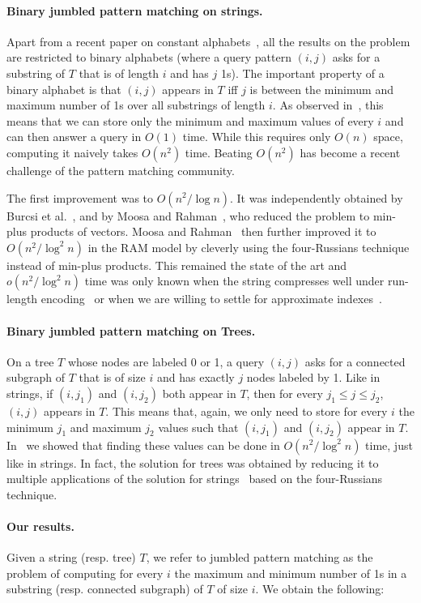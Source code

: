 \documentclass[11pt]{llncs}
\begin{document}
\paragraph{\bf Binary jumbled pattern matching on strings.}
Apart from a recent paper on constant alphabets~\cite{ESA13}, all the
 results on the problem are restricted to binary alphabets (where a query pattern $(i,j)$ asks for a substring of $T$ that is of length $i$ and has $j$ 1s). The important property of a binary alphabet is that $(i,j)$ appears in $T$ iff $j$ is between the minimum and maximum number of 1s over all substrings of length $i$.
As observed in~\cite{CFL09}, this means that we can store only the  minimum and maximum values of every $i$ and can then answer a query in $O(1)$ time. While this requires only $O(n)$ space, computing it naively takes $O(n^2)$ time. Beating $O(n^2)$ has become a recent challenge of the pattern matching community.

The first improvement was to $O(n^2 / \log n)$. It was independently obtained by Burcsi et al.~\cite{BCFL12a}, and by Moosa and Rahman~\cite{MR10}, who reduced the problem to min-plus products of vectors. Moosa and Rahman~\cite{MR12} then further improved it to $O(n^2 / \log^2 n)$ in the RAM model by cleverly using the four-Russians technique instead of min-plus products. This remained the state of the art and $o(n^2 / \log^2 n)$ time was only known when the string compresses well under run-length encoding~\cite{BFKL12,GG12} or when we are willing to settle for approximate indexes~\cite{CLWY12}.

 \paragraph{\bf Binary jumbled pattern matching on Trees.}
On a tree $T$ whose nodes are labeled 0 or 1, a query $(i,j)$ asks for a connected subgraph of $T$ that is of size $i$ and has exactly $j$ nodes labeled by 1. Like in strings, if $(i,j_1)$ and $(i,j_2)$ both appear in $T$, then for every $j_1\le j \le j_2$,  $(i,j)$ appears in $T$. This means that, again, we only need to store for every $i$ the minimum $j_1$ and maximum $j_2$ values such that  $(i,j_1)$ and $(i,j_2)$ appear  in $T$.
In~\cite{OurESA13} we showed that finding these values can be done in $O(n^2 / \log^2 n)$ time, just like in strings.  In fact, the solution for trees was obtained by reducing it to multiple applications of the solution for strings~\cite{MR12} based on the four-Russians technique.

\paragraph{\bf Our results.} Given a string (resp. tree) $T$, we refer to jumbled pattern matching as the problem of computing for every $i$ the maximum and minimum number of 1s in a substring (resp. connected subgraph) of $T$ of size $i$.
We obtain the following:
\end{document}
